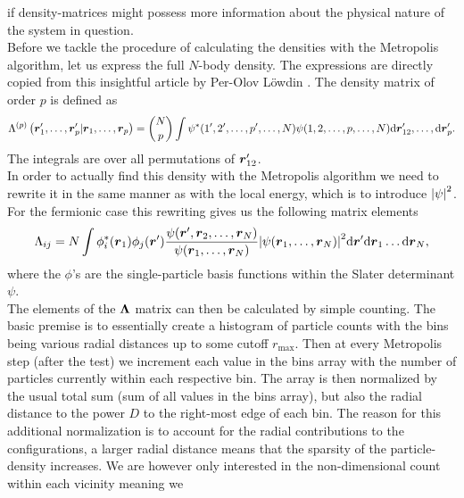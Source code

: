     if density-matrices might possess more information about the physical
    nature of the system in question. \\
    Before we tackle the procedure of calculating the densities with the
    Metropolis algorithm, let us express the full $N$-body density. The
    expressions are directly copied from this insightful article by Per-Olov
    L\"owdin \cite{onebodydens}. The density matrix of order $p$ is defined as
        \begin{equation}
            \Lambda^{(p)}\left(\boldsymbol{{r}}'_1,\dots,\boldsymbol{{r}}'_p|\boldsymbol{{r}}_1,\dots,\boldsymbol{{r}}_p\right)
            = {N\choose p} \int \psi^{*}(1',2',\dots,p',\dots,N)
            \psi(1,2,\dots,p,\dots,N) \mathrm{d}\boldsymbol{{r}}_{12}',\dots,\mathrm{d}\boldsymbol{{r}}_{p}'.
        \end{equation}
    The integrals are over all permutations of $\boldsymbol{{r}}_{12}'$. \\
    In order to actually find this density with the Metropolis algorithm we
    need to rewrite it in the same manner as with the local energy, which is to
    introduce $\abs{\psi}^2$. For the fermionic case this rewriting gives us
    the following matrix elements
        \begin{equation}
            \Lambda_{ij} = N\int\phi^{*}_i(\boldsymbol{{r}}_1)\phi_j(\boldsymbol{{r}}')
            \frac{\psi(\boldsymbol{{r}}',\boldsymbol{{r}}_2,\dots,\boldsymbol{{r}}_N)}{\psi(\boldsymbol{{r}}_1,\dots,\boldsymbol{{r}}_N)}
            \abs{\psi(\boldsymbol{{r}}_1,\dots,\boldsymbol{{r}}_N)}^2
            \mathrm{d}\boldsymbol{{r}}'\mathrm{d}\boldsymbol{{r}}_1\dots\mathrm{d}\boldsymbol{{r}}_N,
        \end{equation}
    where the $\phi$'s are the single-particle basis functions within the
    Slater determinant $\psi$. \\
    The elements of the $\boldsymbol{{\Lambda}}$ matrix can then be calculated by
    simple counting. The basic premise is to essentially create a histogram of
    particle counts with the bins being various radial distances up to some
    cutoff $r_{\text{max}}$. Then at every Metropolis step (after the test) we
    increment each value in the bins array with the number of particles
    currently within each respective bin. The array is then normalized by the
    usual total sum (sum of all values in the bins array), but also the radial
    distance to the power $D$ to the right-most edge of each bin. The reason
    for this additional normalization is to account for the radial
    contributions to the configurations, a larger radial distance means that
    the sparsity of the particle-density increases. We are however only
    interested in the non-dimensional count within each vicinity meaning we
